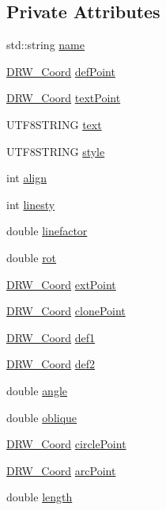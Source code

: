 \subsection*{Private Attributes}
\begin{DoxyCompactItemize}
\item 
std\+::string \hyperlink{class_d_r_w___dimension_a1aa04de9a7c3db31c2bcccda811eeb6b}{name}
\item 
\hyperlink{class_d_r_w___coord}{D\+R\+W\+\_\+\+Coord} \hyperlink{class_d_r_w___dimension_a1f00cdbce7d5d7139578ded6fe44f336}{def\+Point}
\item 
\hyperlink{class_d_r_w___coord}{D\+R\+W\+\_\+\+Coord} \hyperlink{class_d_r_w___dimension_a166186e4b2b8e23b476e2c1b69878c49}{text\+Point}
\item 
U\+T\+F8\+S\+T\+R\+I\+N\+G \hyperlink{class_d_r_w___dimension_a0e7e8ed05c8bf34019ce2594075611cd}{text}
\item 
U\+T\+F8\+S\+T\+R\+I\+N\+G \hyperlink{class_d_r_w___dimension_af781a0d7108a2caf9642b4a7cc79b1fb}{style}
\item 
int \hyperlink{class_d_r_w___dimension_ab4c71bb988fda882c0a5a7d27049c66d}{align}
\item 
int \hyperlink{class_d_r_w___dimension_a3915235284c71e9e87ec6c4c18b95449}{linesty}
\item 
double \hyperlink{class_d_r_w___dimension_a629153fb6c846e1b2d8dabf6e32956d1}{linefactor}
\item 
double \hyperlink{class_d_r_w___dimension_a57b01df4f4f27aafc4adb56fed4b979d}{rot}
\item 
\hyperlink{class_d_r_w___coord}{D\+R\+W\+\_\+\+Coord} \hyperlink{class_d_r_w___dimension_a205674ec560ace6c57f14332a8992e2d}{ext\+Point}
\item 
\hyperlink{class_d_r_w___coord}{D\+R\+W\+\_\+\+Coord} \hyperlink{class_d_r_w___dimension_a62895c83fdbe0acf0d94db2bf3716711}{clone\+Point}
\item 
\hyperlink{class_d_r_w___coord}{D\+R\+W\+\_\+\+Coord} \hyperlink{class_d_r_w___dimension_acce64719064a0d64a19a715c6f42a6a5}{def1}
\item 
\hyperlink{class_d_r_w___coord}{D\+R\+W\+\_\+\+Coord} \hyperlink{class_d_r_w___dimension_a8372d63a865ea08dc547e3ee774abb0c}{def2}
\item 
double \hyperlink{class_d_r_w___dimension_a743d646215e437f004e41427a0c306b5}{angle}
\item 
double \hyperlink{class_d_r_w___dimension_a2f0983aa339252883ae945baad31cf34}{oblique}
\item 
\hyperlink{class_d_r_w___coord}{D\+R\+W\+\_\+\+Coord} \hyperlink{class_d_r_w___dimension_af4a22d548b9618d76cd57583d90eeb12}{circle\+Point}
\item 
\hyperlink{class_d_r_w___coord}{D\+R\+W\+\_\+\+Coord} \hyperlink{class_d_r_w___dimension_ac30d5ff5140020f86f48de68ccd2b907}{arc\+Point}
\item 
double \hyperlink{class_d_r_w___dimension_accab6e5384d68c63b458d364fa9bf0e3}{length}
\end{DoxyCompactItemize}

